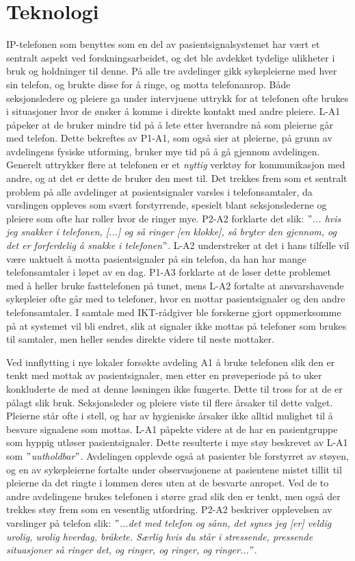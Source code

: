 \section{Teknologi}
IP-telefonen som benyttes som en del av pasientsignalsystemet har vært et sentralt aspekt ved forskningsarbeidet, og det ble avdekket tydelige ulikheter i bruk og holdninger til denne. På alle tre avdelinger gikk sykepleierne med hver sin telefon, og brukte disse for å ringe, og motta telefonanrop. Både seksjonsledere og pleiere ga under intervjuene uttrykk for at telefonen ofte brukes i situasjoner hvor de ønsker å komme i direkte kontakt med andre pleiere. L-A1 påpeker at de bruker mindre tid på å lete etter hverandre nå som pleierne går med telefon. Dette bekreftes av P1-A1, som også sier at pleierne, på grunn av avdelingens fysiske utforming, bruker mye tid på å gå gjennom avdelingen. Generelt uttrykker flere at telefonen er et \textit{nyttig} verktøy for kommunikasjon med andre, og at det er dette de bruker den mest til. Det trekkes frem som et sentralt problem på alle avdelinger at pasientsignaler varsles i telefonsamtaler, da varslingen oppleves som svært forstyrrende, spesielt blant seksjonslederne og pleiere som ofte har roller hvor de ringer mye. P2-A2 forklarte det slik: \textit{ $"$... hvis jeg snakker i telefonen, [...] og så ringer [en klokke], så bryter den gjennom, og det er forferdelig å snakke i telefonen$"$}. L-A2 understreker at det i hans tilfelle vil være uaktuelt å motta pasientsignaler på sin telefon, da han har mange telefonsamtaler i løpet av en dag. P1-A3 forklarte at de løser dette problemet med å heller bruke fasttelefonen på tunet, mens L-A2 fortalte at ansvarshavende sykepleier ofte går med to telefoner, hvor en mottar pasientsignaler og den andre telefonsamtaler. I samtale med IKT-rådgiver ble forskerne gjort oppmerksomme på at systemet vil bli endret, slik at signaler ikke mottas på telefoner som brukes til samtaler, men heller sendes direkte videre til neste mottaker.

\noindent
Ved innflytting i nye lokaler forsøkte avdeling A1 å bruke telefonen slik den er tenkt med mottak av pasientsignaler, men etter en prøveperiode på to uker konkluderte de med at denne løsningen ikke fungerte. Dette til tross for at de er pålagt slik bruk. Seksjonsleder og pleiere viste til flere årsaker til dette valget. Pleierne står ofte i stell, og har av hygieniske årsaker ikke alltid mulighet til å besvare signalene som mottas. L-A1 påpekte videre at de har en pasientgruppe som hyppig utløser pasientsignaler. Dette resulterte i mye støy beskrevet av L-A1 som \textit{$"$uutholdbar$"$}. Avdelingen opplevde også at pasienter ble forstyrret av støyen, og en av sykepleierne fortalte under observasjonene at pasientene mistet tillit til pleierne da det ringte i lommen deres uten at de besvarte anropet. Ved de to andre avdelingene brukes telefonen i større grad slik den er tenkt, men også der trekkes støy frem som en vesentlig utfordring. P2-A2 beskriver opplevelsen av varslinger på telefon slik: \textit{ $"$...det med telefon og sånn, det synes jeg [er] veldig urolig, urolig hverdag, bråkete. Særlig hvis du står i stressende, pressende situasjoner så ringer det, og ringer, og ringer, og ringer...$"$}.


